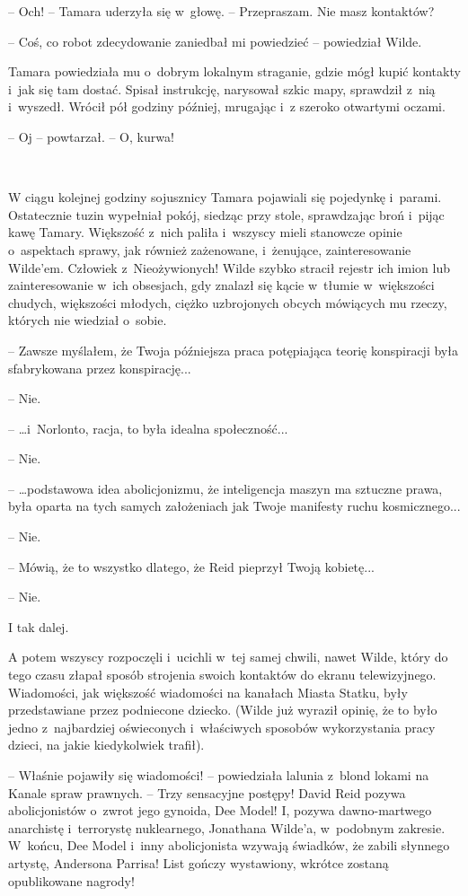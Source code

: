 \documentclass[oneside,polish,11pt,sfheadings]{mwbk}
\begin{document}
-- Och! -- Tamara uderzyła się w~głowę. -- Przepraszam. Nie masz kontaktów?

-- Coś, co robot zdecydowanie zaniedbał mi powiedzieć -- powiedział Wilde.

Tamara powiedziała mu o~dobrym lokalnym straganie, gdzie mógł kupić
kontakty i~jak się tam dostać. Spisał instrukcję, narysował szkic mapy,
sprawdził z~nią i~wyszedł. Wrócił pół godziny później, mrugając i~z szeroko otwartymi oczami. 

-- Oj -- powtarzał. -- O, kurwa!

~

W ciągu kolejnej godziny sojusznicy Tamara pojawiali się pojedynkę i~parami. Ostatecznie tuzin wypełniał pokój, siedząc przy stole,
sprawdzając broń i~pijąc kawę Tamary. Większość z~nich paliła i~wszyscy
mieli stanowcze opinie o~aspektach sprawy, jak również zażenowane, i~żenujące, zainteresowanie Wilde'em. Człowiek z~Nieożywionych! Wilde
szybko stracił rejestr ich imion lub zainteresowanie w~ich obsesjach,
gdy znalazł się kącie w~tłumie w~większości chudych, większości młodych,
ciężko uzbrojonych obcych mówiących mu rzeczy, których nie wiedział o~sobie.

-- Zawsze myślałem, że Twoja późniejsza praca potępiająca teorię
konspiracji była sfabrykowana przez konspirację...

-- Nie.

-- \ldots i~Norlonto, racja, to była idealna społeczność...

-- Nie.

-- \ldots podstawowa idea abolicjonizmu, że inteligencja maszyn ma sztuczne
prawa, była oparta na tych samych założeniach jak Twoje manifesty ruchu
kosmicznego...

-- Nie.

-- Mówią, że to wszystko dlatego, że Reid pieprzył Twoją kobietę...

-- Nie.

I tak dalej.

A potem wszyscy rozpoczęli i~ucichli w~tej samej chwili, nawet Wilde,
który do tego czasu złapał sposób strojenia swoich kontaktów do ekranu
telewizyjnego. Wiadomości, jak większość wiadomości na kanałach Miasta
Statku, były przedstawiane przez podniecone dziecko. (Wilde już wyraził
opinię, że to było jedno z~najbardziej oświeconych i~właściwych sposobów
wykorzystania pracy dzieci, na jakie kiedykolwiek trafił).

-- Właśnie pojawiły się wiadomości! -- powiedziała lalunia z~blond lokami
na Kanale spraw prawnych. -- Trzy sensacyjne postępy! David Reid pozywa
abolicjonistów o~zwrot jego gynoida, Dee Model! I, pozywa dawno-martwego
anarchistę i~terrorystę nuklearnego, Jonathana Wilde'a, w~podobnym
zakresie. W~końcu, Dee Model i~inny abolicjonista wzywają świadków, że
zabili słynnego artystę, Andersona Parrisa! List gończy wystawiony,
wkrótce zostaną opublikowane nagrody!
\end{document}
